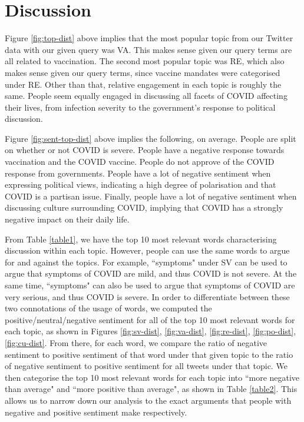 \documentclass[letterpaper]{article} %
\begin{document}
\section{Discussion}
Figure \ref{fig:top-dist} above implies that the most popular topic from our Twitter data with our given query was VA. This makes sense given our query terms are all related to vaccination. The second most popular topic was RE, which also makes sense given our query terms, since vaccine mandates were categorised under RE. Other than that, relative engagement in each topic is roughly the same. People seem equally engaged in discussing all facets of COVID affecting their lives, from infection severity to the government's response to political discussion. \par
Figure \ref{fig:sent-top-dist} above implies the following, on average. People are split on whether or not COVID is severe. People have a negative response towards vaccination and the COVID vaccine. People do not approve of the COVID response from governments. People have a lot of negative sentiment when expressing political views, indicating a high degree of polarisation and that COVID is a partisan issue. Finally, people have a lot of negative sentiment when discussing culture surrounding COVID, implying that COVID has a strongly negative impact on their daily life. \par
From Table \ref{table1}, we have the top 10 most relevant words characterising discussion within each topic. However, people can use the same words to argue for and against the topics. For example, ``symptoms" under SV can be used to argue that symptoms of COVID are mild, and thus COVID is not severe. At the same time, ``symptoms" can also be used to argue that symptoms of COVID are very serious, and thus COVID is severe. In order to differentiate between these two connotations of the usage of words, we computed the positive/neutral/negative sentiment for all of the top 10 most relevant words for each topic, as shown in Figures \ref{fig:sv-dist}, \ref{fig:va-dist}, \ref{fig:re-dist}, \ref{fig:po-dist}, \ref{fig:cu-dist}. From there, for each word, we compare the ratio of negative sentiment to positive sentiment of that word under that given topic to the ratio of negative sentiment to positive sentiment for all tweets under that topic. We then categorise the top 10 most relevant words for each topic into ``more negative than average" and ``more positive than average", as shown in Table \ref{table2}. This allows us to narrow down our analysis to the exact arguments that people with negative and positive sentiment make respectively. \par
\end{document}
